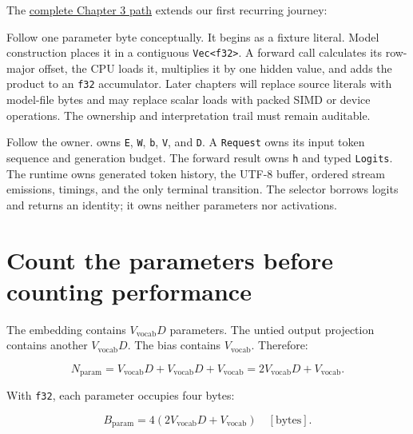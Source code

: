 The
\href{https://github.com/hermonai/inside-the-llm-engine/blob/astra-visual-rewrite/diagrams/model/token-id-to-logits.txt}{complete
Chapter 3 path} extends our first recurring journey:


Follow one parameter byte conceptually. It begins as a fixture literal.
Model construction places it in a contiguous
\texttt{Vec\textless{}f32\textgreater{}}. A forward call calculates its
row-major offset, the CPU loads it, multiplies it by one hidden value,
and adds the product to an \texttt{f32} accumulator. Later chapters will
replace source literals with model-file bytes and may replace scalar
loads with packed SIMD or device operations. The ownership and
interpretation trail must remain auditable.

Follow the owner. \texttt{} owns \texttt{E},
\texttt{W}, \texttt{b}, \texttt{V}, and \texttt{D}. A \texttt{Request}
owns its input token sequence and generation budget. The forward result
owns \texttt{h} and typed \texttt{Logits}. The runtime owns generated
token history, the UTF-8 buffer, ordered stream emissions, timings, and
the only terminal transition. The selector borrows logits and returns an
identity; it owns neither parameters nor activations.

\section{Count the parameters before counting
performance}\label{count-the-parameters-before-counting-performance}

The embedding contains \(V_{\mathrm{vocab}}D\) parameters. The untied
output projection contains another \(V_{\mathrm{vocab}}D\). The bias
contains \(V_{\mathrm{vocab}}\). Therefore:

\begin{equation}
N_{\mathrm{param}}
=V_{\mathrm{vocab}}D+V_{\mathrm{vocab}}D+V_{\mathrm{vocab}}
=2V_{\mathrm{vocab}}D+V_{\mathrm{vocab}}.
\end{equation}

With \texttt{f32}, each parameter occupies four bytes:

\begin{equation}
B_{\mathrm{param}}
=4\left(2V_{\mathrm{vocab}}D+V_{\mathrm{vocab}}\right)
\quad[\mathrm{bytes}].
\end{equation}

